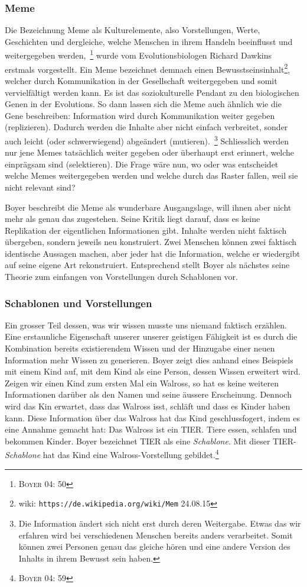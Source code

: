 \subsubsection*{Meme}
Die Bezeichnung Meme als Kulturelemente, also Vorstellungen, Werte, Geschichten und dergleiche, welche Menschen in ihrem Handeln beeinflusst und weitergegeben werden,~\footnote{\textsc{Boyer} 04: 50} wurde vom Evolutionsbiologen Richard Dawkins erstmals vorgestellt. Ein Meme bezeichnet demnach einen Bewusstseinsinhalt\footnote{wiki: \texttt{https://de.wikipedia.org/wiki/Mem} 24.08.15}, welcher durch Kommunikation in der Gesellschaft weitergegeben und somit vervielfältigt werden kann. Es ist das soziokulturelle Pendant zu den biologischen Genen in der Evolutions. So dann lassen sich die Meme auch ähnlich wie die Gene beschreiben: Information wird durch Kommunikation weiter gegeben (replizieren). Dadurch werden die Inhalte aber nicht einfach verbreitet, sonder auch leicht (oder schwerwiegend) abgeändert (mutieren).~\footnote{Die Information ändert sich nicht erst durch deren Weitergabe. Etwas das wir erfahren wird bei verschiedenen Menschen bereits anders verarbeitet. Somit können zwei Personen genau das gleiche hören und eine andere Version des Inhalts in ihrem Bewusst sein haben.} Schliesslich werden nur jene Memes tatsächlich weiter gegeben oder überhaupt erst erinnert, welche einprägsam sind (selektieren). Die Frage wäre nun, wo oder was entscheidet welche Memes weitergegeben werden und welche durch das Raster fallen, weil sie nicht relevant sind? 

Boyer beschreibt die Meme als wunderbare Ausgangslage, will ihnen aber nicht mehr als genau das zugestehen. Seine Kritik liegt darauf, dass es keine Replikation der eigentlichen Informationen gibt. Inhalte werden nicht faktisch übergeben, sondern jeweils neu konstruiert. Zwei Menschen können zwei faktisch identische Aussagen machen, aber jeder hat die Information, welche er wiedergibt auf seine eigene Art rekonstruiert. Entsprechend stellt Boyer als nächstes seine Theorie zum einfangen von Vorstellungen durch Schablonen vor. 

\subsubsection*{Schablonen und Vorstellungen}
Ein grosser Teil dessen, was wir wissen musste uns niemand faktisch erzählen. Eine erstaunliche Eigenschaft unserer unserer geistigen Fähigkeit ist es durch die Kombination bereits existierendem Wissen und der Hinzugabe einer neuen Information mehr Wissen zu generieren. Boyer zeigt dies anhand eines Beispiels mit einem Kind auf, mit dem Kind als eine Person, dessen Wissen erweitert wird. Zeigen wir einen Kind zum ersten Mal ein Walross, so hat es keine weiteren Informationen darüber als den Namen und seine äussere Erscheinung. Dennoch wird das Kin erwartet, dass das Walross isst, schläft und dass es Kinder haben kann. Diese Information über das Walross hat das Kind geschlussfogert, indem es eine Annahme gemacht hat: Das Walross ist ein TIER. Tiere essen, schlafen und bekommen Kinder. Boyer bezeichnet TIER als eine \emph{Schablone}. Mit dieser TIER-\emph{Schablone} hat das Kind eine Walross-Vorstellung gebildet.\footnote{\textsc{Boyer 04: 59}}   

